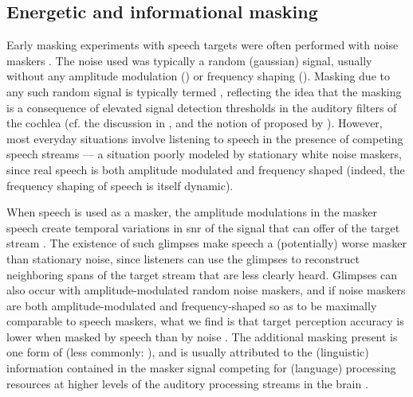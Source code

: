 \subsection{Energetic and informational masking\label{sec:InfoMasking}}
Early masking experiments with speech targets were often performed with noise maskers \citep[\eg][]{HawkinsStevens1950,Tolhurst1957b,PollackPickett1958}.  The noise used was typically a random (gaussian) signal, usually without any amplitude modulation () or frequency shaping ().  Masking due to any such random signal is typically termed , reflecting the idea that the masking is a consequence of elevated signal detection thresholds in the auditory filters of the cochlea (cf. the discussion in \citealt[96–97]{Moore2008}, and the notion of  proposed by \citealt{DurlachEtAl2003a}).  However, most everyday situations involve listening to speech in the presence of competing speech streams — a situation poorly modeled by stationary white noise maskers, since real speech is both amplitude modulated and frequency shaped (indeed, the frequency shaping of speech is itself dynamic).

\label{par:Glimpsing}When speech is used as a masker, the amplitude modulations in the masker speech create temporal variations in \ac{snr} of the signal that can offer  of the target stream \citep{FestenPlomp1990}.  The existence of such glimpses make speech a (potentially) worse masker than stationary noise, since listeners can use the glimpses to reconstruct neighboring spans of the target stream that are less clearly heard.\footnotemark{}  Glimpses can also occur with amplitude-modulated random noise maskers, and if noise maskers are both amplitude-modulated and frequency-shaped so as to be maximally comparable to speech maskers, what we find is that target perception accuracy is lower when masked by speech than by noise \citep[\eg][]{CarhartEtAl1969,LewisEtAl1988,SimpsonCooke2005}.  The additional masking present is one form of  (less commonly: ), and is usually attributed to the (linguistic) information contained in the masker signal competing for (language) processing resources at higher levels of the auditory processing streams in the brain \citep{DurlachEtAl2003a}.


